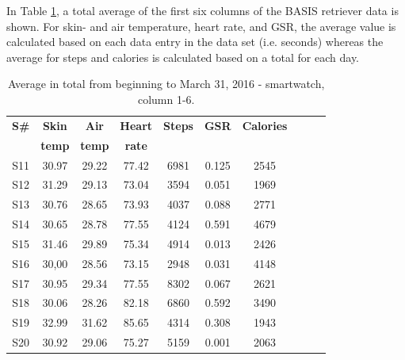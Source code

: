 \documentclass[12pt]{article} %
\begin{document}
In Table \ref{tab:averageTotal}, a total average of the first six columns of the BASIS retriever data is shown. For skin- and air temperature, heart rate, and GSR, the average value is calculated based on each data entry in the data set (i.e. seconds) whereas the average for steps and calories is calculated based on a total for each day. 

\begin{table}[H]
\center
\begin{footnotesize}
	\begin{tabular}{| c | c | c | c | c | c | c | c | c | c |}
	\hline
	\textbf{S\#} & \textbf{Skin} & \textbf{Air} & \textbf{Heart} & \textbf{Steps} & \textbf{GSR} & \textbf{Calories}\\
	 & \textbf{temp} & \textbf{temp} & \textbf{rate} & & & \\
	
	\hline
	S11 & 30.97 & 29.22 & 77.42 & 6981 & 0.125 & 2545 \\
	\hline
	S12 & 31.29 & 29.13 & 73.04 & 3594 & 0.051 & 1969 \\
	\hline
	S13 & 30.76 & 28.65 & 73.93 & 4037 & 0.088 & 2771 \\
	\hline
	S14 & 30.65 & 28.78 & 77.55 & 4124 & 0.591 & 4679 \\
	\hline
	S15 & 31.46 & 29.89 & 75.34 & 4914 & 0.013 & 2426 \\
	\hline
	S16 & 30,00 & 28.56 & 73.15 & 2948 & 0.031 & 4148 \\
	\hline
	S17 & 30.95 & 29.34 & 77.55 & 8302 & 0.067 & 2621 \\
	\hline
	S18 & 30.06 & 28.26 & 82.18 & 6860 & 0.592 & 3490 \\
	\hline
	S19 & 32.99 & 31.62 & 85.65 & 4314 & 0.308 & 1943 \\
	\hline
	S20 & 30.92 & 29.06 & 75.27 & 5159 & 0.001 & 2063 \\
	\hline
	\end{tabular}
	\caption{Average in total from beginning to March 31, 2016 - smartwatch, column 1-6.}
	\label{tab:averageTotal}
\end{footnotesize}
\end{table}
\end{document}
